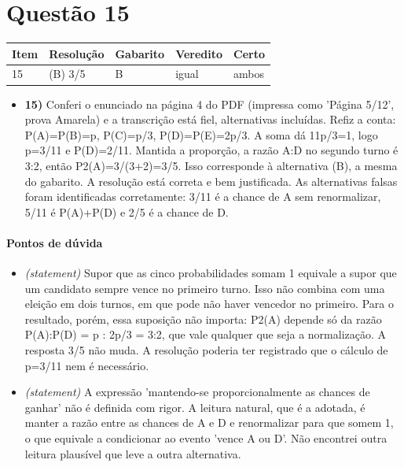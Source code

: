 \documentclass{article}%
\begin{document}
\section*{Questão 15}%
\begin{longtable}{@{}p{} p{} p{} p{} p{}@{}}\toprule Item & Resolução & Gabarito & Veredito & Certo \\ \midrule
15 & (B) 3/5 & B & igual & ambos \\
\bottomrule\end{longtable}%
\begin{itemize}%
\item%
\textbf{15)} Conferi o enunciado na página 4 do PDF (impressa como 'Página 5/12', prova Amarela) e a transcrição está fiel, alternativas incluídas. Refiz a conta: P(A)=P(B)=p, P(C)=p/3, P(D)=P(E)=2p/3. A soma dá 11p/3=1, logo p=3/11 e P(D)=2/11. Mantida a proporção, a razão A:D no segundo turno é 3:2, então P2(A)=3/(3+2)=3/5. Isso corresponde à alternativa (B), a mesma do gabarito. A resolução está correta e bem justificada. As alternativas falsas foram identificadas corretamente: 3/11 é a chance de A sem renormalizar, 5/11 é P(A)+P(D) e 2/5 é a chance de D.%
\end{itemize}%
\paragraph{Pontos de dúvida}%
\begin{itemize}%
\item%
\textit{(statement)} Supor que as cinco probabilidades somam 1 equivale a supor que um candidato sempre vence no primeiro turno. Isso não combina com uma eleição em dois turnos, em que pode não haver vencedor no primeiro. Para o resultado, porém, essa suposição não importa: P2(A) depende só da razão P(A):P(D) = p : 2p/3 = 3:2, que vale qualquer que seja a normalização. A resposta 3/5 não muda. A resolução poderia ter registrado que o cálculo de p=3/11 nem é necessário.%
\item%
\textit{(statement)} A expressão 'mantendo{-}se proporcionalmente as chances de ganhar' não é definida com rigor. A leitura natural, que é a adotada, é manter a razão entre as chances de A e D e renormalizar para que somem 1, o que equivale a condicionar ao evento 'vence A ou D'. Não encontrei outra leitura plausível que leve a outra alternativa.%
\end{itemize}%
\end{document}
